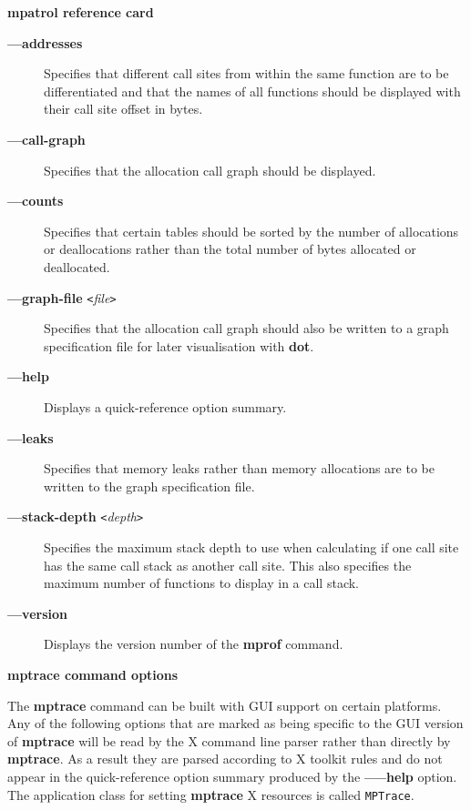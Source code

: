 \documentclass[a4paper,landscape,final]{article}
\newcommand{\heading}[1]{\textbf{\normalsize #1}}
\newcommand{\command}[1]{\textbf{#1}}
\newcommand{\flag}[1]{\textbf{---#1}}
\newcommand{\flagpar}[2]{\flag{#1} \texttt{<}\textit{#2}\texttt{>}}
\begin{document}
\begin{multicols}{3}{\textbf{\Large mpatrol reference card}}
\begin{description}
\item[\flag{addresses}]
Specifies that different call sites from within the same function are to be
differentiated and that the names of all functions should be displayed with
their call site offset in bytes.
\item[\flag{call-graph}]
Specifies that the allocation call graph should be displayed.
\item[\flag{counts}]
Specifies that certain tables should be sorted by the number of allocations or
deallocations rather than the total number of bytes allocated or deallocated.
\item[\flagpar{graph-file}{file}]
Specifies that the allocation call graph should also be written to a graph
specification file for later visualisation with \command{dot}.
\item[\flag{help}]
Displays a quick-reference option summary.
\item[\flag{leaks}]
Specifies that memory leaks rather than memory allocations are to be written to
the graph specification file.
\item[\flagpar{stack-depth}{depth}]
Specifies the maximum stack depth to use when calculating if one call site has
the same call stack as another call site.  This also specifies the maximum
number of functions to display in a call stack.
\item[\flag{version}]
Displays the version number of the \command{mprof} command.
\end{description}

\vskip 12pt
\heading{mptrace command options}
\vskip 6pt

The \command{mptrace} command can be built with GUI support on certain
platforms.  Any of the following options that are marked as being specific to
the GUI version of \command{mptrace} will be read by the X command line parser
rather than directly by \command{mptrace}.  As a result they are parsed
according to X toolkit rules and do not appear in the quick-reference option
summary produced by the \flag{--help} option.  The application class for setting
\command{mptrace} X resources is called \texttt{MPTrace}.


\end{multicols}
\end{document}
